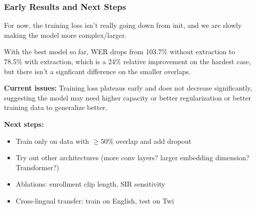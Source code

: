 \documentclass{beamer}
\begin{document}
\begin{frame}
\frametitle{Early Results and Next Steps}

\small
For now, the training loss isn't really going down from init, and we are slowly making the model more complex/larger.

With the best model so far, WER drops from 103.7\% without extraction to 78.5\% with extraction, which is a 24\% relative improvement on the hardest case, but there isn't a signficant difference on the smaller overlaps. 

\vspace{0.15cm}

\textbf{Current issues:} Training loss plateaus early and does not decrease significantly, suggesting the model may need higher capacity or better regularization or better training data to generalize better. 

\vspace{0.15cm}

\textbf{Next steps:}
\begin{itemize}
    \item Train only on data with $\geq 50\%$ overlap and add dropout
    \item Try out other architectures (more conv layers? larger embedding dimension? Transformer?)
    \item Ablations: enrollment clip length, SIR sensitivity
    \item Cross-lingual transfer: train on English, test on Twi
\end{itemize}

\end{frame}
\end{document}

